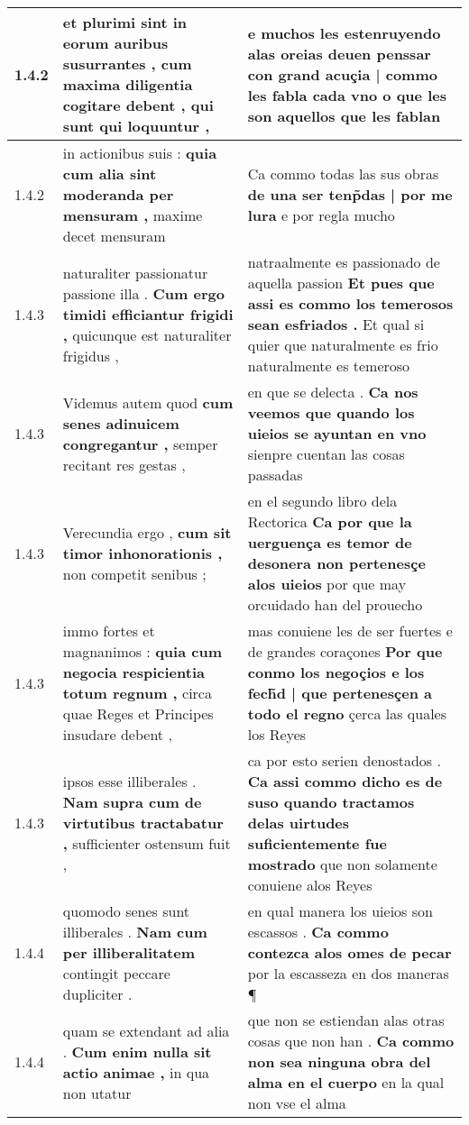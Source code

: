 \begin{tabular}{|p{1cm}|p{6.5cm}|p{6.5cm}|}
1.4.2 & et plurimi sint in eorum auribus susurrantes , \textbf{ cum maxima diligentia cogitare debent , } qui sunt qui loquuntur , & e muchos les estenruyendo alas oreias \textbf{ deuen penssar con grand acuçia | commo les fabla cada vno } o que les son aquellos que les fablan \\\hline
1.4.2 & in actionibus suis : \textbf{ quia cum alia sint moderanda per mensuram , } maxime decet mensuram & Ca commo todas las sus obras \textbf{ de una ser tenp̃das | por me lura } e por regla mucho \\\hline
1.4.3 & naturaliter passionatur passione illa . \textbf{ Cum ergo timidi efficiantur frigidi , } quicunque est naturaliter frigidus , & natraalmente es passionado de aquella passion \textbf{ Et pues que assi es commo los temerosos sean esfriados . } Et qual si quier que naturalmente es frio naturalmente es temeroso \\\hline
1.4.3 & Videmus autem quod \textbf{ cum senes adinuicem congregantur , } semper recitant res gestas , & en que se delecta . \textbf{ Ca nos veemos que quando los uieios se ayuntan en vno } sienpre cuentan las cosas passadas \\\hline
1.4.3 & Verecundia ergo , \textbf{ cum sit timor inhonorationis , } non competit senibus ; & en el segundo libro dela Rectorica \textbf{ Ca por que la uerguença es temor de desonera non pertenesçe alos uieios } por que may orcuidado han del prouecho \\\hline
1.4.3 & immo fortes et magnanimos : \textbf{ quia cum negocia respicientia totum regnum , } circa quae Reges et Principes insudare debent , & mas conuiene les de ser fuertes e de grandes coraçones \textbf{ Por que conmo los negoçios e los fech̃d | que pertenesçen a todo el regno } çerca las quales los Reyes \\\hline
1.4.3 & ipsos esse illiberales . \textbf{ Nam supra cum de virtutibus tractabatur , } sufficienter ostensum fuit , & ca por esto serien denostados . \textbf{ Ca assi commo dicho es de suso quando tractamos delas uirtudes suficientemente fue mostrado } que non solamente conuiene alos Reyes \\\hline
1.4.4 & quomodo senes sunt illiberales . \textbf{ Nam cum per illiberalitatem } contingit peccare dupliciter . & en qual manera los uieios son escassos . \textbf{ Ca commo contezca alos omes de pecar } por la escasseza en dos maneras ¶ \\\hline
1.4.4 & quam se extendant ad alia . \textbf{ Cum enim nulla sit actio animae , } in qua non utatur & que non se estiendan alas otras cosas que non han . \textbf{ Ca commo non sea ninguna obra del alma en el cuerpo } en la qual non vse el alma \\\hline

\end{tabular}

